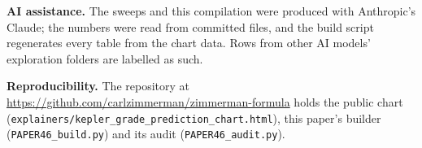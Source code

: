 \documentclass[10pt]{article}
\begin{document}
\textbf{AI assistance.} The sweeps and this compilation were produced with Anthropic's Claude; the numbers were read from committed files, and the build script regenerates every table from the chart data. Rows from other AI models' exploration folders are labelled as such.

\textbf{Reproducibility.} The repository at \url{https://github.com/carlzimmerman/zimmerman-formula} holds the public chart (\texttt{explainers/kepler\_grade\_prediction\_chart.html}), this paper's builder (\texttt{PAPER46\_build.py}) and its audit (\texttt{PAPER46\_audit.py}).
\end{document}
